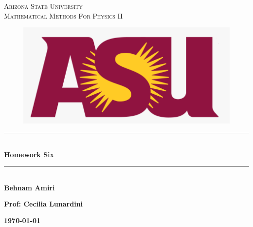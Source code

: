 \documentclass[fleqn]{article}
\begin{document}
  \begin{titlepage}

    \newcommand{\HRule}{\rule{\linewidth}{0.5mm}}

    \center


    \textsc{\LARGE Arizona State University}\\[1.5cm]

    \textsc{\LARGE Mathematical Methods For Physics II }\\[1.5cm]


    \begin{figure}
      \includegraphics[width=\linewidth]{asu.png}
    \end{figure}


    \HRule \\[0.4cm]
    { \huge \bfseries Homework Six}\\[0.4cm] 
    \HRule \\[1.5cm]

    \textbf{Behnam Amiri}

    \bigbreak

    \textbf{Prof: Cecilia Lunardini}

    \bigbreak


    \textbf{{\large \today}\\[2cm]}

    \vfill

  \end{titlepage}
\end{document}
